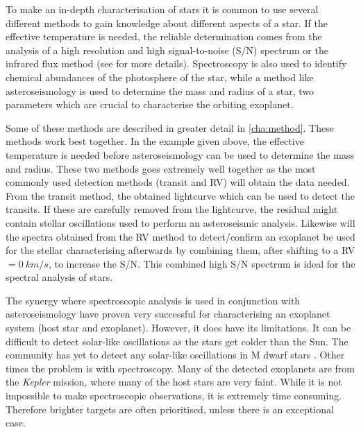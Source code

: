 To make an in-depth characterisation of stars it is common to use several different methods to gain
knowledge about different aspects of a star. If the effective temperature is needed, the reliable
determination comes from the analysis of a high resolution and high signal-to-noise (S/N) spectrum
or the infrared flux method (see  for more details). Spectroscopy is also used to
identify chemical abundances of the photosphere of the star, while a method like asteroseismology is
used to determine the mass and radius of a star, two parameters which are crucial to characterise
the orbiting exoplanet.

Some of these methods are described in greater detail in \cref{cha:method}. These methods work best
together. In the example given above, the effective temperature is needed before asteroseismology
can be used to determine the mass and radius. These two methods goes extremely well together as the
most commonly used detection methods (transit and RV) will obtain the data needed. From the transit
method, the obtained lightcurve which can be used to detect the transits. If these are carefully
removed from the lightcurve, the residual might contain stellar oscillations used to perform an
asteroseismic analysis. Likewise will the spectra obtained from the RV method to detect/confirm an
exoplanet be used for the stellar characterising afterwards by combining them, after shifting to a
RV$=\SI{0}{km/s}$, to increase the S/N. This combined high S/N spectrum is ideal for the spectral
analysis of stars.

The synergy where spectroscopic analysis is used in conjunction with asteroseismology have proven
very successful \citep[see e.g.][]{Huber2013} for characterising an exoplanet system (host star and
exoplanet). However, it does have its limitations. It can be difficult to detect solar-like
oscillations as the stars get colder than the Sun. The community has yet to detect any solar-like
oscillations in M dwarf stars \citep{Rodriguez2016,Berdinas2017}. Other times the problem is with
spectroscopy. Many of the detected exoplanets are from the \emph{Kepler} mission, where many of the
host stars are very faint. While it is not impossible to make spectroscopic observations, it is
extremely time consuming. Therefore brighter targets are often prioritised, unless there is an
exceptional case.

